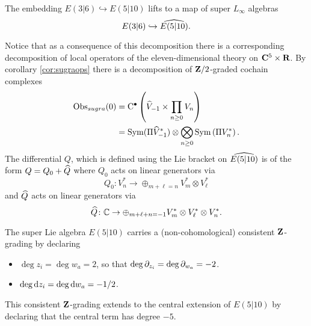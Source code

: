 \documentclass[11pt]{amsart}
\begin{document}
\begin{lem} 
The embedding $E(3|6) \hookrightarrow E(5|10)$ lifts to a map of super $L_\infty$ algebras 
\[
E(3|6) \hookrightarrow \Hat{E(5|10)} .
\]
\end{lem}

\parsec[s:localopsdecompose]
Notice that as a consequence of this decomposition there is a corresponding decomposition of local operators of the eleven-dimensional theory on $\C^5 \times \R$. 
By corollary \ref{cor:sugraops} there is a decomposition of $\Z/2$-graded cochain complexes 
\begin{align*}
\Obs_{sugra} (0) & = \clie^\bu \left( \Hat{V}_{-1} \times \prod_{n \geq 0} V_n \right) \\
& = \Sym(\Pi \Hat{V}^*_{-1}) \otimes \bigotimes_{n \geq 0} \Sym\left(\Pi V^*_n\right) .
\end{align*}
The differential $Q$, which is defined using the Lie bracket on $\Hat{E(5|10)}$ is of the form
$Q = Q_0 + \Hat{Q}$ where $Q_0$ acts on linear generators via
\[
Q_0 \colon V^*_n \to \oplus_{m + \ell = n} V^*_m \otimes V^*_\ell
\]
and $\Hat{Q}$ acts on linear generators via
\[
\Hat{Q} \colon \CC \to \oplus_{m + \ell + n = -1} V^*_m \otimes V^*_\ell \otimes V^*_n .
\]

\parsec[s:e510grading]

The super Lie algebra $E(5|10)$ carries a (non-cohomological) consistent $\Z$-grading by declaring 
\begin{itemize}
\item $\deg z_i = \deg w_a = 2$, so that $\deg \del_{z_i} = \deg \del_{w_a} = -2$. 
\item $\deg \d z_i = \deg \d w_a = -1/2$.
\end{itemize}
This consistent $\Z$-grading extends to the central extension of $E(5|10)$ by declaring that the central term has degree $-5$. 
\end{document}
